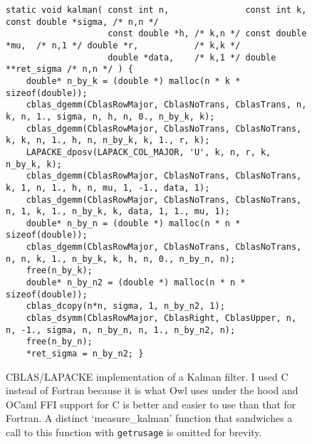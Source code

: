 \begin{landscape}
\begin{figure}[p]
    \centering
    \begin{verbatim}
static void kalman( const int n,               const int k,                const double *sigma, /* n,n */
                    const double *h, /* k,n */ const double *mu,  /* n,1 */ double *r,           /* k,k */
                    double *data,    /* k,1 */ double **ret_sigma /* n,n */ ) {
    double* n_by_k = (double *) malloc(n * k * sizeof(double));
    cblas_dgemm(CblasRowMajor, CblasNoTrans, CblasTrans, n, k, n, 1., sigma, n, h, n, 0., n_by_k, k);
    cblas_dgemm(CblasRowMajor, CblasNoTrans, CblasNoTrans, k, k, n, 1., h, n, n_by_k, k, 1., r, k);
    LAPACKE_dposv(LAPACK_COL_MAJOR, 'U', k, n, r, k, n_by_k, k);
    cblas_dgemm(CblasRowMajor, CblasNoTrans, CblasNoTrans, k, 1, n, 1., h, n, mu, 1, -1., data, 1);
    cblas_dgemm(CblasRowMajor, CblasNoTrans, CblasNoTrans, n, 1, k, 1., n_by_k, k, data, 1, 1., mu, 1);
    double* n_by_n = (double *) malloc(n * n * sizeof(double));
    cblas_dgemm(CblasRowMajor, CblasNoTrans, CblasNoTrans, n, n, k, 1., n_by_k, k, h, n, 0., n_by_n, n);
    free(n_by_k);
    double* n_by_n2 = (double *) malloc(n * n * sizeof(double));
    cblas_dcopy(n*n, sigma, 1, n_by_n2, 1);
    cblas_dsymm(CblasRowMajor, CblasRight, CblasUpper, n, n, -1., sigma, n, n_by_n, n, 1., n_by_n2, n);
    free(n_by_n);
    *ret_sigma = n_by_n2; }
    \end{verbatim}
    \caption{CBLAS/LAPACKE implementation of a Kalman filter. I used C instead
        of Fortran because it is what Owl uses under the hood and OCaml FFI
        support for C is better and easier to use than that for Fortran. A distinct
        `measure\_kalman' function that sandwiches a call to this function with
        \texttt{getrusage} is omitted for brevity.}\label{fig:cblas_kalman}

\end{figure}
\end{landscape}
